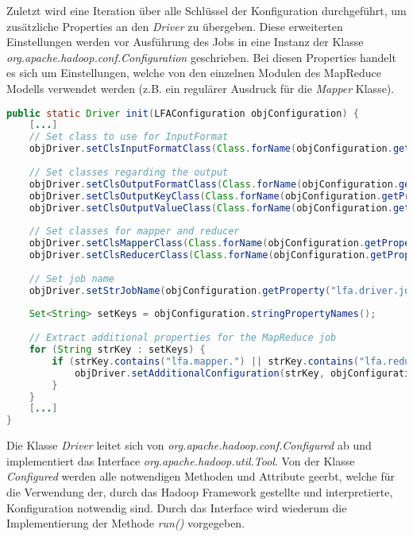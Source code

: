 Zuletzt wird eine Iteration über alle Schlüssel der Konfiguration durchgeführt, um zusätzliche Properties an den \textit{Driver} zu übergeben. Diese erweiterten Einstellungen werden vor Ausführung des Jobs in eine Instanz der Klasse \textit{org.apache.hadoop.conf.Configuration} geschrieben. Bei diesen Properties handelt es sich um Einstellungen, welche von den einzelnen Modulen des MapReduce Modells verwendet werden (z.B. ein regulärer Ausdruck für die \textit{Mapper} Klasse).\\

\begin{lstlisting}[language=Java,caption=Auszug der Methode \textit{Bootstrap:init()},label=lst:BootstrapInit]
public static Driver init(LFAConfiguration objConfiguration) {
	[...]
	// Set class to use for InputFormat
	objDriver.setClsInputFormatClass(Class.forName(objConfiguration.getProperty("lfa.driver.input.format")));
	
	// Set classes regarding the output
	objDriver.setClsOutputFormatClass(Class.forName(objConfiguration.getProperty("lfa.driver.output.format")));
	objDriver.setClsOutputKeyClass(Class.forName(objConfiguration.getProperty("lfa.driver.output.key")));
	objDriver.setClsOutputValueClass(Class.forName(objConfiguration.getProperty("lfa.driver.output.value")));
	
	// Set classes for mapper and reducer
	objDriver.setClsMapperClass(Class.forName(objConfiguration.getProperty("lfa.driver.mapper")));
	objDriver.setClsReducerClass(Class.forName(objConfiguration.getProperty("lfa.driver.reducer")));
	
	// Set job name
	objDriver.setStrJobName(objConfiguration.getProperty("lfa.driver.job.name"));
	
	Set<String> setKeys = objConfiguration.stringPropertyNames();
	
	// Extract additional properties for the MapReduce job
	for (String strKey : setKeys) {
		if (strKey.contains("lfa.mapper.") || strKey.contains("lfa.reducer.") || strKey.contains("lfa.driver.add.")) {
			objDriver.setAdditionalConfiguration(strKey, objConfiguration.getProperty(strKey));
		}
	}
	[...]
}
\end{lstlisting}

Die Klasse \textit{Driver} leitet sich von \textit{org.apache.hadoop.conf.Configured} ab und implementiert das Interface \textit{org.apache.hadoop.util.Tool}. Von der Klasse \textit{Configured} werden alle notwendigen Methoden und Attribute geerbt, welche für die Verwendung der, durch das Hadoop Framework gestellte und interpretierte, Konfiguration notwendig sind. Durch das Interface wird wiederum die Implementierung der Methode \textit{run()} vorgegeben.

